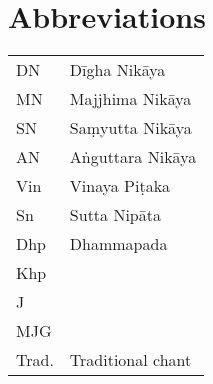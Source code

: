 \chapter*{Abbreviations}


\begin{tabular}{@{} l l @{}}
DN & Dīgha Nikāya \\
MN & Majjhima Nikāya \\
SN & Saṃyutta Nikāya \\
AN & Aṅguttara Nikāya \\
Vin & Vinaya Piṭaka \\
Sn & Sutta Nipāta \\
Dhp & Dhammapada \\
Khp & \\
J & \\
MJG & \\
Trad. & Traditional chant\\
\end{tabular}

%

